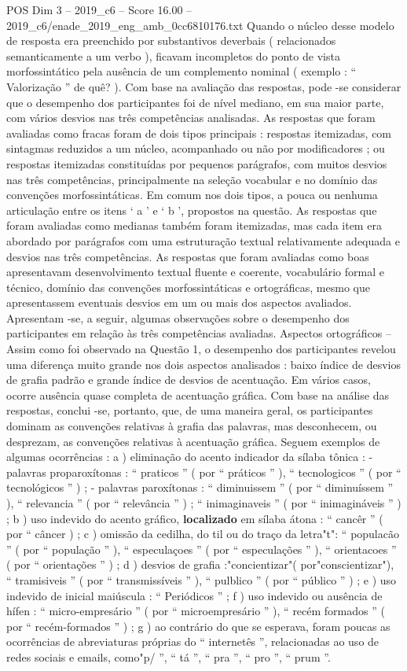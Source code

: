 \begin{textsample}{POS Dim 3 – 2019\_c6 – Score 16.00 – 2019\_c6/enade\_2019\_eng\_amb\_0cc6810176.txt}
Quando o núcleo desse modelo de resposta era preenchido por substantivos deverbais ( relacionados semanticamente a um verbo ), ficavam incompletos do ponto de vista morfossintático pela ausência de um complemento nominal ( exemplo : “ Valorização ” de quê? ).
Com base na avaliação das respostas, pode -se considerar que o desempenho dos participantes foi de nível mediano, em sua maior parte, com vários desvios nas três competências analisadas.
As respostas que foram avaliadas como fracas foram de dois tipos principais : respostas itemizadas, com sintagmas reduzidos a um núcleo, acompanhado ou não por modificadores ; ou respostas itemizadas constituídas por pequenos parágrafos, com muitos desvios nas três competências, principalmente na seleção vocabular e no domínio das convenções morfossintáticas.
Em comum nos dois tipos, a pouca ou nenhuma articulação entre os itens ‘ a ’ e ‘ b ’, propostos na questão.
As respostas que foram avaliadas como medianas também foram itemizadas, mas cada item era abordado por parágrafos com uma estruturação textual relativamente adequada e desvios nas três competências.
As respostas que foram avaliadas como boas apresentavam desenvolvimento textual fluente e coerente, vocabulário formal e técnico, domínio das convenções morfossintáticas e ortográficas, mesmo que apresentassem eventuais desvios em um ou mais dos aspectos avaliados.
Apresentam -se, a seguir, algumas observações sobre o desempenho dos participantes em relação às três competências avaliadas.
Aspectos ortográficos – Assim como foi observado na Questão 1, o desempenho dos participantes revelou uma diferença muito grande nos dois aspectos analisados : baixo índice de desvios de grafia padrão e grande índice de desvios de acentuação.
Em vários casos, ocorre ausência quase completa de acentuação gráfica.
Com base na análise das respostas, conclui -se, portanto, que, de uma maneira geral, os participantes dominam as convenções relativas à grafia das palavras, mas desconhecem, ou desprezam, as convenções relativas à acentuação gráfica.
Seguem exemplos de algumas ocorrências : a ) eliminação do acento indicador da sílaba tônica : - palavras proparoxítonas : “ praticos ” ( por “ práticos ” ), “ tecnologicos ” ( por “ tecnológicos ” ) ; - palavras paroxítonas : “ diminuissem ” ( por “ diminuíssem ” ), “ relevancia ” ( por “ relevância ” ) ; “ inimaginaveis ” ( por “ inimagináveis ” ) ; b ) uso indevido do acento gráfico, \textbf{localizado} em sílaba átona : “ cancêr ” ( por “ câncer ) ; c ) omissão da cedilha, do til ou do traço da letra"t": “ populacão ” ( por “ população ” ), “ especulaçoes ” ( por “ especulações ” ), “ orientacoes ” ( por “ orientações ” ) ; d ) desvios de grafia :"concientizar"( por"conscientizar"), “ tramisiveis ” ( por “ transmissíveis ” ), “ pulblico ” ( por “ público ” ) ; e ) uso indevido de inicial maiúscula : “ Periódicos ” ; f ) uso indevido ou ausência de hífen : “ micro-empresário ” ( por “ microempresário ” ), “ recém formados ” ( por “ recém-formados ” ) ; g ) ao contrário do que se esperava, foram poucas as ocorrências de abreviaturas próprias do “ internetês ”, relacionadas ao uso de redes sociais e emails, como"p/ ”, “ tá ”, “ pra ”, “ pro ”, “ prum ”.

\end{textsample}

